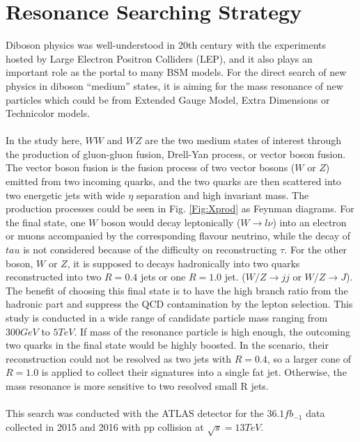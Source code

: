 \chapter{Resonance Searching Strategy}
Diboson physics was well-understood in 20th century with the experiments hosted by Large Electron Positron Colliders (LEP), and it also plays an important role as the portal to many BSM models. For the direct search of new physics in diboson ``medium'' states, it is aiming for the mass resonance of new particles which could be from Extended Gauge Model, Extra Dimensions or Technicolor models.
\\
\\In the study here, $WW$ and $WZ$ are the two medium states of interest through the production of gluon-gluon fusion, Drell-Yan process, or vector boson fusion. The vector boson fusion is the fusion process of two vector bosons ($W$ or $Z$) emitted from two incoming quarks, and the two quarks are then scattered into two energetic jets with wide $\eta$ separation and high invariant mass. The production processes could be seen in Fig. \ref{Fig:Xprod} as Feynman diagrams. For the final state, one $W$ boson would decay leptonically ($W\rightarrow l\nu$) into an electron or muons accompanied by the corresponding flavour neutrino, while the decay of $tau$ is not considered because of the difficulty on reconstructing $\tau$. For the other boson, $W$ or $Z$,  it is supposed to decays hadronically into two quarks reconstructed into two $R=0.4$ jets or one $R=1.0$ jet. ($W/Z\rightarrow jj$ or $W/Z\rightarrow J$). The benefit of choosing this final state is to have the high branch ratio from the hadronic part and suppress the QCD contamination by the lepton selection. This study is conducted in a wide range of candidate particle mass ranging from $300GeV$ to $5TeV$. If mass of the resonance particle is high enough, the outcoming two quarks in the final state would be highly boosted. In the scenario, their reconstruction could not be resolved as two jets with $R=0.4$, so a larger cone of $R=1.0$ is applied to collect their signatures into a single fat jet. Otherwise, the mass resonance is more sensitive to two resolved small R jets. 
\\
\\This search was conducted with the ATLAS detector for the $36.1fb_{-1}$ data collected in 2015 and 2016 with pp collision at $\sqrt{s}=13TeV$. 

